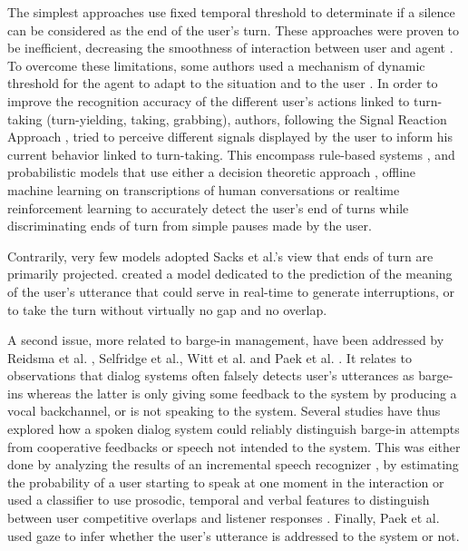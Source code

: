 The simplest approaches use fixed temporal threshold to determinate if a silence can be considered as the end of the user's turn. These approaches were proven to be inefficient, decreasing the
smoothness of interaction between user and agent \citep{ward_root_2005}. To
overcome these limitations, some authors used a mechanism
of dynamic threshold for the agent to adapt to the
situation and to the user \citep{bohus_decisions_2011,witt_modeling_2014}. In order to improve the recognition accuracy of the different user's actions linked to turn-taking (turn-yielding, taking, grabbing), authors, following the Signal Reaction Approach \citep{duncan_signals_1972}, tried to perceive different signals displayed by the user to inform his current behavior linked to turn-taking.   
This encompass rule-based systems \citep{cassell_embodiment_1999,thorisson_natural_2002}, and probabilistic
models that use either a decision theoretic approach \citep{bohus_decisions_2011,raux_optimizing_2012}, offline machine learning on transcriptions of human conversations \citep{schlangen_reaction_2006,huang_multimodal_2011} or realtime reinforcement learning \citep{jonsdottir_distributed_2013} to accurately detect the user's end of turns while discriminating ends of turn from simple pauses made by the user. 

Contrarily, very few models adopted Sacks et al.'s view that ends of turn are primarily projected. \citep{de_vault_incremental_2011} created a model dedicated to the prediction of the meaning of the user's utterance that could serve in real-time to generate interruptions, or to take the turn without virtually no gap and no overlap.

A second issue, more related to barge-in management,
have been addressed by Reidsma et al. \citep{reidsma_continuous_2011}, Selfridge et al.\citep{selfridge_continuously_2013}, Witt et al.\citep{witt_modeling_2014} and Paek et al. \citep{paek_continuous_2000}. It relates to observations
that dialog systems often falsely detects user's utterances as barge-ins whereas
the latter is only giving some feedback to the system by
producing a vocal backchannel, or is not speaking to the
system. Several studies have thus explored how a spoken
dialog system could reliably distinguish barge-in
attempts from cooperative feedbacks or speech not intended
to the system. This was either done by analyzing the results of an incremental speech recognizer \citep{selfridge_continuously_2013}, by estimating the probability of a user starting to speak at one moment in the interaction \citep{witt_modeling_2014} or used a classifier to use prosodic, temporal and verbal features to distinguish between user competitive overlaps and listener responses \citep{reidsma_continuous_2011}. Finally, Paek et al. \citep{paek_continuous_2000} used gaze to infer whether the user's utterance is addressed to the system or not. 

